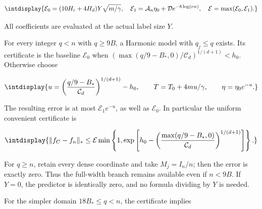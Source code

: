 \begingroup\renewcommand{\theHequation}{intdisplay.184}
\begin{equation}
\intdisplay{
\mathcal E_0=(10H_c+4H_d)Y\sqrt{m/\gamma},\quad
\mathcal E_1=\mathcal A_n\eta_0+\mathcal D e^{-8\log(en)},\quad
\mathcal E=\max(\mathcal E_0,\mathcal E_1).
}
\label{int:eq-0073-harmonic-budget-coefficients}
\end{equation}
\endgroup


All coefficients are evaluated at the actual label size \(Y\).



For every integer \(q<n\) with \(q\ge9B\), a Harmonic model with \(q_j\le q\) exists. Its certificate is the baseline \(\mathcal E_0\) when \((\max(q/9-B_*,\allowbreak 0)/\mathcal C_d)^{1/(d+1)}<h_0\). Otherwise choose


\begingroup\renewcommand{\theHequation}{intdisplay.185}
\begin{equation}
\intdisplay{
u=\left(\frac{q/9-B_*}{\mathcal C_d}\right)^{1/(d+1)}-h_0,
\qquad T=T_0+4mu/\gamma,\qquad \eta=\eta_0e^{-u}.
}
\label{int:eq-0074-harmonic-construction-from-supplied-budget}
\end{equation}
\endgroup


The resulting error is at most \(\mathcal E_1e^{-u}\), as well as \(\mathcal E_0\). In particular the uniform convenient certificate is


\begingroup\renewcommand{\theHequation}{intdisplay.186}
\begin{equation}
\intdisplay{
\|f_C-f_n\|_*\le
\mathcal E\min\left\{1,
 \exp\left[h_0-
  \left(\frac{\max(q/9-B_*,0)}{\mathcal C_d}\right)^{1/(d+1)}\right]
\right\}.
}
\label{int:eq-0075-harmonic-exact-budget-certificate}
\end{equation}
\endgroup


For \(q\ge n\), retain every dense coordinate and take \(M_j=I_n/n\); then the error is exactly zero. Thus the full-width branch remains available even if \(n<9B\). If \(Y=0\), the predictor is identically zero, and no formula dividing by \(Y\) is needed.



For the simpler domain \(18B_*\le q<n\), the certificate implies


